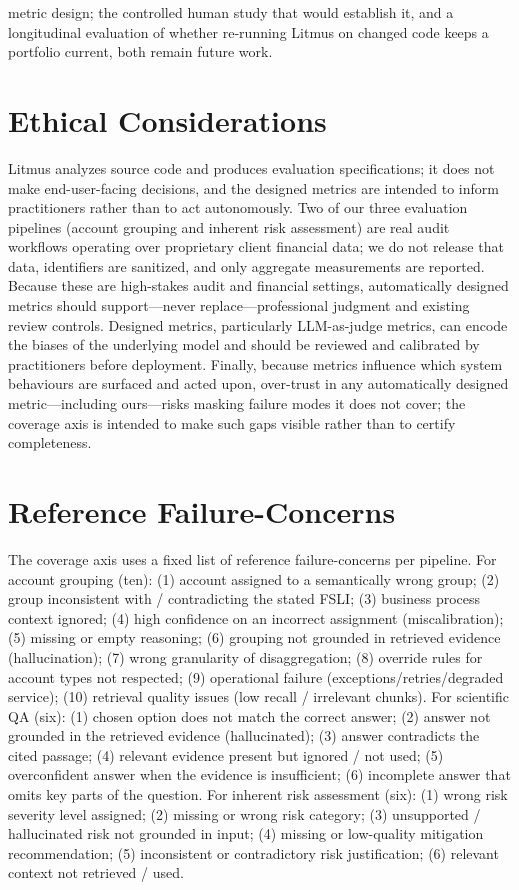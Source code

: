 \documentclass[11pt]{article}
\begin{document}
metric design; the controlled human study that would establish it, and a longitudinal evaluation of whether re-running Litmus on changed code keeps a portfolio current, both remain future work.

\section*{Ethical Considerations}
\label{sec:ethics}

Litmus analyzes source code and produces evaluation specifications; it does not make end-user-facing decisions, and the designed metrics are intended to inform practitioners rather than to act autonomously. Two of our three evaluation pipelines (account grouping and inherent risk assessment) are real audit workflows operating over proprietary client financial data; we do not release that data, identifiers are sanitized, and only aggregate measurements are reported. Because these are high-stakes audit and financial settings, automatically designed metrics should support---never replace---professional judgment and existing review controls. Designed metrics, particularly LLM-as-judge metrics, can encode the biases of the underlying model and should be reviewed and calibrated by practitioners before deployment. Finally, because metrics influence which system behaviours are surfaced and acted upon, over-trust in any automatically designed metric---including ours---risks masking failure modes it does not cover; the coverage axis is intended to make such gaps visible rather than to certify completeness.



\appendix

\section{Reference Failure-Concerns}
\label{app:concerns}
The coverage axis uses a fixed list of reference failure-concerns per pipeline. For account grouping (ten): (1) account assigned to a semantically wrong group; (2) group inconsistent with / contradicting the stated FSLI; (3) business process context ignored; (4) high confidence on an incorrect assignment (miscalibration); (5) missing or empty reasoning; (6) grouping not grounded in retrieved evidence (hallucination); (7) wrong granularity of disaggregation; (8) override rules for account types not respected; (9) operational failure (exceptions/retries/degraded service); (10) retrieval quality issues (low recall / irrelevant chunks). For scientific QA (six): (1) chosen option does not match the correct answer; (2) answer not grounded in the retrieved evidence (hallucinated); (3) answer contradicts the cited passage; (4) relevant evidence present but ignored / not used; (5) overconfident answer when the evidence is insufficient; (6) incomplete answer that omits key parts of the question. For inherent risk assessment (six): (1) wrong risk severity level assigned; (2) missing or wrong risk category; (3) unsupported / hallucinated risk not grounded in input; (4) missing or low-quality mitigation recommendation; (5) inconsistent or contradictory risk justification; (6) relevant context not retrieved / used.
\end{document}
